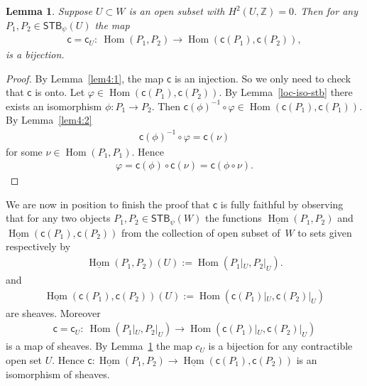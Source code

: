 \documentclass[pdftex]{sigma}
\numberwithin{equation}{section}
\newtheorem{Lemma}{Lemma}[section]
\begin{document}
\begin{Lemma}\label{lem4:3}
  Suppose $U\subset W$ is an open subset with $H^2(U,{\mathbb Z}) =0$.  Then for
    any $P_1, P_2 \in {\textsf{STB}}_\psi (U)$ the map
\begin{gather*}
{\textsf{c}}= {\textsf{c}}_U \colon \  \operatorname{Hom}(P_1, P_2) \to \operatorname{Hom}({\textsf{c}}(P_1) , {\textsf{c}}(P_2)),
\end{gather*}
is a bijection.
\end{Lemma}
\begin{proof}
By Lemma~\ref{lem4:1}, the map ${\textsf{c}}$ is an injection.
So we only need to check that ${\textsf{c}}$ is onto.
  Let $\varphi \in
  \operatorname{Hom}({\textsf{c}}(P_1), {\textsf{c}}(P_2))$.  By Lemma~\ref{loc-iso-stb} there exists an
  isomorphism $\phi\colon P_1\to P_2$.  Then ${\textsf{c}}(\phi)^{-1} \circ \varphi \in
  \operatorname{Hom}({\textsf{c}}(P_1), {\textsf{c}}(P_1))$. By Lemma~\ref{lem4:2}
\begin{gather*}
{\textsf{c}}(\phi)^{-1} \circ \varphi = {\textsf{c}} (\nu)
\end{gather*}
for some $\nu\in \operatorname{Hom}(P_1,P_1)$.  Hence
\begin{gather*}
\varphi = {\textsf{c}}(\phi)\circ {\textsf{c}} (\nu) = {\textsf{c}}(\phi\circ \nu).\tag*{\qed}
\end{gather*}
\renewcommand{\qed}{}
\end{proof}

We are now in position to f\/inish the proof that ${\textsf{c}}$ is fully faithful
by observing that for any two objects $P_1, P_2\in {\textsf{STB}}_\psi (W)$ the
functions $\underline{\operatorname{Hom}} (P_1, P_2)$ and $\underline{\operatorname{Hom}}
({\textsf{c}}(P_1), {\textsf{c}}(P_2))$ from the collection of open subset of~$W$ to sets
given respectively by
\begin{gather*}
\underline{\operatorname{Hom}} (P_1, P_2)(U):= \operatorname{Hom} (P_1|_U, P_2|_U).
\end{gather*}
and
\begin{gather*}
\underline{\operatorname{Hom}} ({\textsf{c}}(P_1), {\textsf{c}}(P_2))(U):= \operatorname{Hom} ({\textsf{c}}(P_1)|_U, {\textsf{c}}(P_2)|_U)
\end{gather*}
are sheaves.  Moreover
\begin{gather*}
{\textsf{c}} = {\textsf{c}}_U \colon \  \operatorname{Hom} (P_1|_U, P_2|_U) \to \operatorname{Hom} ({\textsf{c}}(P_1)|_U, {\textsf{c}}(P_2)|_U)
\end{gather*}
is a map of sheaves.  By Lemma~\ref{lem4:3} the map $c_U$ is a
bijection for any contractible open set $U$.  Hence ${\textsf{c}}\colon
\underline{\operatorname{Hom}} (P_1, P_2) \to \underline{\operatorname{Hom}} ({\textsf{c}}(P_1), {\textsf{c}}(P_2))$
is an isomorphism of sheaves.
\end{document}
